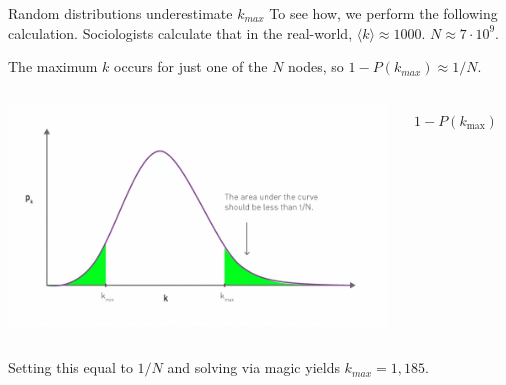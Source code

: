 \documentclass{beamer}
\begin{document}
\begin{frame}{Random distributions underestimate $k_{max}$}
  To see how, we perform the following calculation. Sociologists calculate
  that in the real-world, $\langle k \rangle \approx 1000$. $N \approx 7 \cdot 10^9$.

  The maximum $k$ occurs for
  just one of the $N$ nodes, so $1 - P(k_{max}) \approx 1/N$. \\[.25em]

  \begin{columns}
    \begin{column}{.48\textwidth}
      \includegraphics[width=\textwidth]{Figures/maxDegreeCalc.jpg}
    \end{column}
    \begin{column}{.48\textwidth}
      \begin{align*}
        1 - P(k_{\max}) & = 1 - e^{-\langle k \rangle} \sum_{k=0}^{k_{\max}} 
                                                     \frac{\langle k \rangle^k}{k!}  \\
                        & = e^{-\langle k \rangle} \sum_{k=k_{\max}+1}^{\infty} 
                                                     \frac{\langle k \rangle^k}{k!}  \\
                        & \approx e^{-\langle k \rangle} \frac{\langle k \rangle^{k_{\max}+1}}{(k_{\max} + 1)!}
      \end{align*}
    \end{column}
  \end{columns}
  Setting this equal to $1/N$ and solving via magic yields $k_{max} = 1,185$.
\end{frame}
\end{document}
